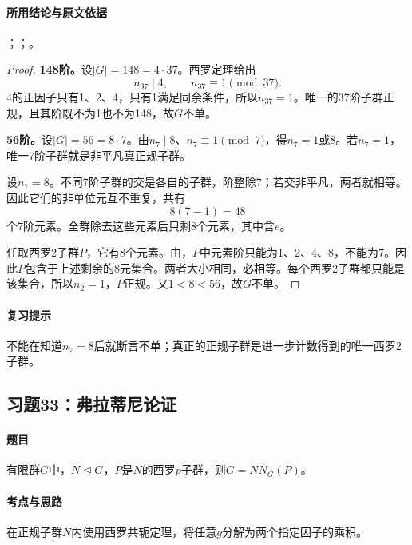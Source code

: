 \paragraph{所用结论与原文依据}
；；。


\begin{proof}
\textbf{148阶。}设$|G|=148=4\cdot37$。西罗定理给出
\[
n_{37}\mid4,\qquad n_{37}\equiv1\pmod{37}.
\]
4的正因子只有1、2、4，只有1满足同余条件，所以$n_{37}=1$。唯一的37阶子群正规，且其阶既不为1也不为148，故$G$不单。

\textbf{56阶。}设$|G|=56=8\cdot7$。由$n_7\mid8$、$n_7\equiv1\pmod7$，得$n_7=1$或8。若$n_7=1$，唯一7阶子群就是非平凡真正规子群。

设$n_7=8$。不同7阶子群的交是各自的子群，阶整除7；若交非平凡，两者就相等。因此它们的非单位元互不重复，共有
\[
8(7-1)=48
\]
个7阶元素。全群除去这些元素后只剩8个元素，其中含$e$。

任取西罗2子群$P$，它有8个元素。由，$P$中元素阶只能为1、2、4、8，不能为7。因此$P$包含于上述剩余的8元集合。两者大小相同，必相等。每个西罗2子群都只能是该集合，所以$n_2=1$，$P$正规。又$1<8<56$，故$G$不单。
\end{proof}

\paragraph{复习提示}
不能在知道$n_7=8$后就断言不单；真正的正规子群是进一步计数得到的唯一西罗2子群。


\subsection{习题33：\texorpdfstring{弗拉蒂尼论证}{弗拉蒂尼论证}}
\label{ex:2:33}

\paragraph{题目}
有限群$G$中，$N\trianglelefteq G$，$P$是$N$的西罗$p$子群，则$G=N N_G(P)$。

\paragraph{考点与思路}
在正规子群$N$内使用西罗共轭定理，将任意$g$分解为两个指定因子的乘积。

